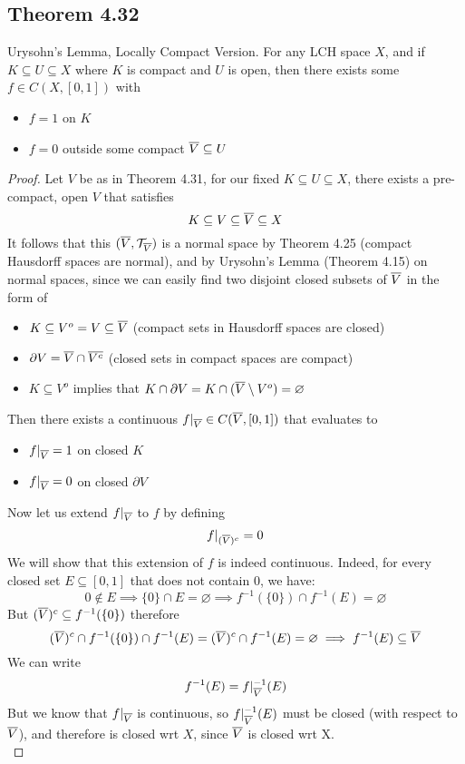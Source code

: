 \documentclass[../../main.tex]{subfiles}
\begin{document}
\subsection{Theorem 4.32}
\begin{wts}
    Urysohn's Lemma, Locally Compact Version. For any LCH space $X$, and if $K\subseteq U\subseteq X$ where $K$ is compact and $U$ is open, then there exists some $f\in C(X,[0,1])$ with \begin{itemize}
        \item $f=1$ on $K$
        \item $f=0$ outside some compact $\overline{V}\subseteq U$
    \end{itemize}
\end{wts}
\newcommand{\restrictV}{|_{\cl{V}}}
\begin{proof}
    Let $V$ be as in Theorem 4.31, for our fixed $K\subseteq U\subseteq X$, there exists a pre-compact, open $V$ that satisfies
    \[
    K\subseteq V\subseteq \overline{V}\subseteq X
    \]
    It follows that this $(\overline{V},\mathcal{T}_{\overline{V}})$ is a normal space by Theorem 4.25 (compact Hausdorff spaces are normal), and by Urysohn's Lemma (Theorem 4.15) on normal spaces, since we can easily find two disjoint closed subsets of $\overline{V}$ in the form of \begin{itemize}
        \item $K\subseteq V^o = V\subseteq \overline{V}$ (compact sets in Hausdorff spaces are closed)
        \item $\partial V=\overline{V}\cap\overline{V^c}$ (closed sets in compact spaces are compact)
        \item $K\subseteq V^o$ implies that $K\cap\partial V =K\cap(\overline{V}\setminus V^o)= \varnothing$
    \end{itemize}
    Then there exists a continuous $f\restrictV\in C(\cl{V},[0,1])$ that evaluates to
    \begin{itemize}
        \item $f\restrictV = 1$ on closed $K$
        \item $f\restrictV = 0$ on closed $\partial V$
    \end{itemize}
    Now let us extend $f\restrictV$ to $f$ by defining 
    \[
    f|_{(\overline{V})^c} = 0
    \]
    We will show that this extension of $f$ is indeed continuous. Indeed, for every closed set $E\subseteq [0,1]$ that does not contain $0$, we have:
    \[
    0\notin E\implies \{0\}\cap E=\varnothing\implies f^{-1}(\{0\})\cap f^{-1}(E)=\varnothing
    \]
    But $(\overline{V})^c\subseteq f^{-1}(\{0\})$ therefore
    \[
    (\overline{V})^c\cap f^{-1}(\{0\})\cap f^{-1}(E)=(\overline{V})^c\cap f^{-1}(E)=\varnothing\implies f^{-1}(E)\subseteq \overline{V}
    \]
    We can write
    \[
    f^{-1}(E)=f\restrictV^{-1}(E)
    \]
    But we know that $f\restrictV$ is continuous, so $f\restrictV^{-1}(E)$ must be closed (with respect to $\overline{V}$), and therefore is closed wrt $X$, since $\overline{V}$ is closed wrt X.\\
    

\end{proof}
\end{document}
